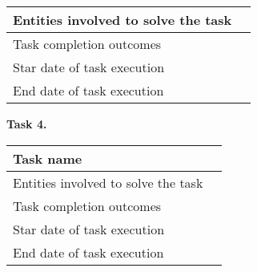 \begin{description}
\begin{tabular}{|p{}|p{}|}
        Entities involved to solve the task & \\
        \hline
        Task completion outcomes            & \\
        \hline
        Star date of task execution         & \\
        \hline
        End date of task execution          & \\
        \hline
    \end{tabular}
    \item \hspace*{8mm}\textbf{Task 4.}\\
    \begin{tabular}{|p{}|p{}|}
        \hline
        Task name                           & \\
        \hline
        Entities involved to solve the task & \\
        \hline
        Task completion outcomes            & \\
        \hline
        Star date of task execution         & \\
        \hline
        End date of task execution          & \\
        \hline
    \end{tabular}
\end{description}

